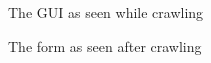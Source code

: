 \begin{figure}[H]

\caption{The GUI as seen while crawling}
\end{figure}
\begin{figure}[H]

\caption{The form as seen after crawling}
\end{figure}
